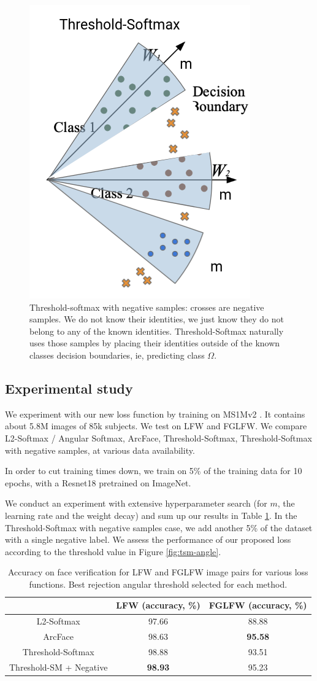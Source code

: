 \begin{figure}
    \centering
    \includegraphics[width=0.25\columnwidth]{50-files/tsm-neg.png}
    \caption{Threshold-softmax with negative samples: crosses are negative samples. We do not know their identities, we just know they do not belong to any of the known identities. Threshold-Softmax naturally uses those samples by placing their identities outside of the known classes decision boundaries, ie, predicting class $\Omega$.}
    \label{fig:neg-tsm}
\end{figure}

\subsection{Experimental study}

We experiment with our new loss function by training on MS1Mv2 \cite{celeb1m}. It contains about 5.8M images of 85k subjects. We test on LFW and FGLFW. We compare L2-Softmax / Angular Softmax, ArcFace, Threshold-Softmax, Threshold-Softmax with negative samples, at various data availability.

In order to cut training times down, we train on 5\% of the training data for 10 epochs, with a Resnet18 pretrained on ImageNet.

We conduct an experiment with extensive hyperparameter search (for $m$, the learning rate and the weight decay) and sum up our results in Table \ref{tab:tsm-lfw}. In the Threshold-Softmax with negative samples case, we add another 5\% of the dataset with a single negative label. We assess the performance of our proposed loss according to the threshold value in Figure \ref{fig:tsm-angle}.

\begin{table}[]
    \centering
    \begin{tabular}{|c|c|c|}
        \hline
         & LFW (accuracy, \%) & FGLFW (accuracy, \%) \\
        \hline
        L2-Softmax & 97.66 & 88.88 \\
        \hline
        ArcFace & 98.63 & \textbf{95.58} \\
        \hline
        Threshold-Softmax & 98.88 & 93.51 \\
        \hline
        Threshold-SM + Negative & \textbf{98.93} & 95.23 \\
        \hline
    \end{tabular}
    \caption{Accuracy on face verification for LFW and FGLFW image pairs for various loss functions. Best rejection angular threshold selected for each method.}
    \label{tab:tsm-lfw}
\end{table}

